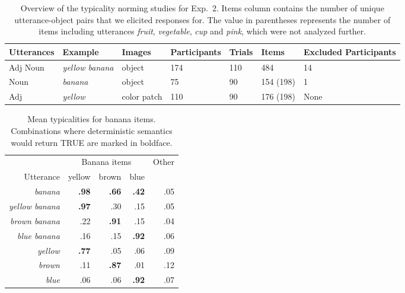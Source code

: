 \documentclass[11pt]{article}
\begin{document}
\begin{table}[bt!]
	\begin{tabular}{l l l l l l l}
		\toprule
		Utterances & Example & Images & Participants & Trials & Items & Excluded Participants\\
		\midrule
		Adj Noun & \emph{yellow banana} & object & 174 & 110 & 484 & 14\\ 
		Noun & \emph{banana} & object & 75 & 90 & 154 (198) & 1\\
		Adj & \emph{yellow} & color patch & 110 & 90 & 176 (198) & None\\
		\bottomrule
	\end{tabular}
	\vspace{2mm}
	\caption{Overview of the typicality norming studies for Exp.~2. Items column contains the number of unique utterance-object pairs that we elicited responses for. The value in parentheses represents the number of items including utterances \textit{fruit}, \textit{vegetable}, \textit{cup} and \textit{pink}, which were not analyzed further.}
	\label{tab:normingoverview}
\end{table}

\begin{table}[bt!]
	\caption{Mean typicalities for banana items. Combinations where deterministic semantics would return TRUE are marked in boldface.}
\centering
	\begin{tabular}{r r r r r}
		\toprule
		& \multicolumn{3}{c}{Banana items} & Other \\
		Utterance & yellow & brown  & blue & \\ 
		\midrule
		\emph{banana} & \textbf{.98} & \textbf{.66} & \textbf{.42} & .05  \\
		\midrule
		\emph{yellow banana} & \textbf{.97} & .30 & .15 & .05 \\
		\emph{brown banana} & .22 & \textbf{.91} & .15 & .04\\
		\emph{blue banana} & .16 & .15 & \textbf{.92} & .06\\
		\midrule
		\emph{yellow} & \textbf{.77} & .05 & .06 & .09 \\
		\emph{brown} & .11 & \textbf{.87} & .01 & .12\\
		\emph{blue} & .06 & .06 & \textbf{.92} & .07\\		
		\bottomrule
	\end{tabular}
	\vspace{5mm}
	\label{tab:bananatypicalities}
\end{table}
\end{document}
